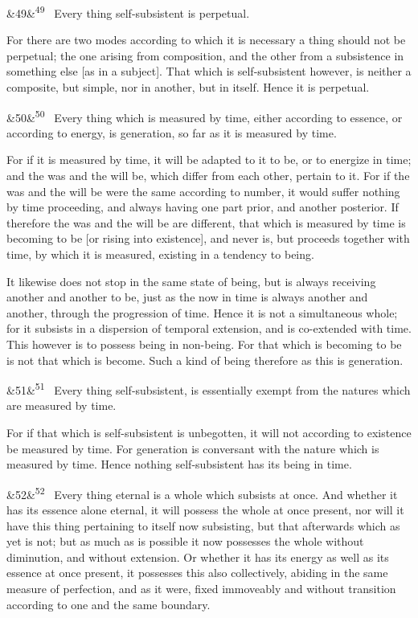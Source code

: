 \documentclass[12pt]{article}
\newcommand{\para}[1][]{\par\noindent\ifx&#1&\else\textsuperscript{\footnotesize #1}~\fi}
\begin{document}
\para[49] Every thing self-subsistent is perpetual.

For there are two modes according to which it is necessary a thing should not be perpetual; the one arising from composition, and the other from a subsistence in something else [as in a subject]. That which is self-subsistent however, is neither a composite, but simple, nor in another, but in itself. Hence it is perpetual.

\para[50] Every thing which is measured by time, either according to essence, or according to energy, is generation, so far as it is measured by time.

For if it is measured by time, it will be adapted to it to be, or to energize in time; and the was and the will be, which differ from each other, pertain to it. For if the was and the will be were the same according to number, it would suffer nothing by time proceeding, and always having one part prior, and another posterior. If therefore the was and the will be are different, that which is measured by time is becoming to be [or rising into existence], and never is, but proceeds together with time, by which it is measured, existing in a tendency to being.

It likewise does not stop in the same state of being, but is always receiving another and another to be, just as the now in time is always another and another, through the progression of time. Hence it is not a simultaneous whole; for it subsists in a dispersion of temporal extension, and is co-extended with time. This however is to possess being in non-being. For that which is becoming to be is not that which is become. Such a kind of being therefore as this is generation.

\para[51] Every thing self-subsistent, is essentially exempt from the natures which are measured by time.

For if that which is self-subsistent is unbegotten, it will not according to existence be measured by time. For generation is conversant with the nature which is measured by time. Hence nothing self-subsistent has its being in time.

\para[52] Every thing eternal is a whole which subsists at once. And whether it has its essence alone eternal, it will possess the whole at once present, nor will it have this thing pertaining to itself now subsisting, but that afterwards which as yet is not; but as much as is possible it now possesses the whole without diminution, and without extension. Or whether it has its energy as well as its essence at once present, it possesses this also collectively, abiding in the same measure of perfection, and as it were, fixed immoveably and without transition according to one and the same boundary.
\end{document}
